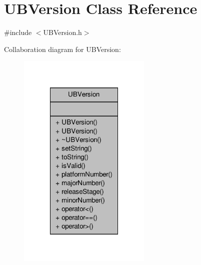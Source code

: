 \hypertarget{class_u_b_version}{\section{U\-B\-Version Class Reference}
\label{d2/da9/class_u_b_version}
}


{\ttfamily \#include $<$U\-B\-Version.\-h$>$}



Collaboration diagram for U\-B\-Version\-:
\nopagebreak
\begin{figure}[H]
\begin{center}
\leavevmode
\includegraphics[width=180pt]{da/d85/class_u_b_version__coll__graph}
\end{center}
\end{figure}
